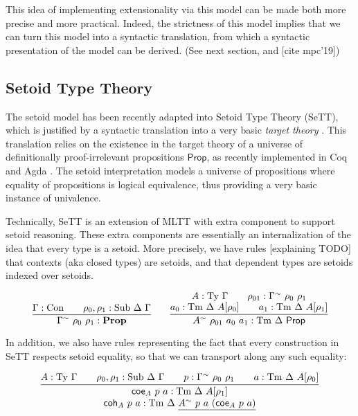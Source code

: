 \documentclass{easychair}
\newcommand{\GG}{\Gamma}
\newcommand{\DD}{\Delta}
\newcommand{\GD}{\Delta}
\newcommand{\coe}{\textsf{coe}}
\newcommand{\coh}{\textsf{coh}}
\newcommand{\tyj}[2]{#2 : \Ty\ #1}
\newcommand{\tmj}[3]{#2 : \Tm\ #1\ #3}
\newcommand{\subj}[3]{#1 : \mathrm{Sub}\ #2\ #3}
\newcommand{\Prop}{\textsf{Prop}}
\newcommand{\Con}{\mathrm{Con}}
\newcommand{\Ty}{\mathrm{Ty}}
\newcommand{\Tm}{\mathrm{Tm}}
\newcommand{\metaprop}{\mathbf{Prop}}
\begin{document}
This idea of implementing extensionality via this model can be made both more
precise and more practical. Indeed, the strictness of this model implies that we
can turn this model into a syntactic translation, from which a syntactic
presentation of the model can be derived. (See next section, and [cite mpc'19])


\subsection{Setoid Type Theory}

The setoid model has been recently adapted into Setoid Type Theory (SeTT), which
is justified by a syntactic translation into a very basic \emph{target theory}
\cite{mpc19}. This translation relies on the existence in the target theory of a
universe of definitionally proof-irrelevant propositions $\Prop$, as recently
implemented in Coq and Agda \cite{gilbert}. The setoid interpretation models a
universe of propositions where equality of propositions is logical equivalence,
thus providing a very basic instance of univalence.

Technically, SeTT is an extension of MLTT with extra component to support setoid
reasoning. These extra components are essentially an internalization of the idea
that every type is a setoid. More precisely, we have rules [explaining TODO]
that contexts (aka closed types) are setoids, and that dependent types are
setoids indexed over setoids.

\[
\infer{
  \GG^\sim\ \rho_0\ \rho_1 : \metaprop
}{
  \GG : \Con \qquad \subj{\rho_0, \rho_1}{\DD}{\GG}
}
\qquad
\infer{
  A^{\sim}\ \rho_{01}\ a_0\ a_1 : \Tm\ \DD\ \Prop
}{
  \deduce{
    a_0 : \Tm\ \DD\ A[\rho_0] \qquad a_1 : \Tm\ \DD\ A[\rho_1]
  }{
    A : \Ty\ \GG \qquad \rho_{01} : \GG^{\sim}\ \rho_0\ \rho_1
  }
}
\]


In addition, we also have rules representing the fact that every construction in
SeTT respects setoid equality, so that we can transport along any such equality:

    \[
    \infer{
      \deduce{
        \tmj{\GD}{\coh_A\ p\ a}{\underline{A^\sim\ p\ a\ (\coe_A\ p\ a)}}
      }{
        \tmj{\GD}{\coe_A\ p\ a}{A[\rho_1]}
      }
    }{
      \tyj{\GG}{A} \qquad \subj{\rho_0, \rho_1}{\GD}{\GG} \qquad
      p : \GG^\sim\ \rho_0\ \rho_1\qquad
      \tmj{\GD}{a}{A[\rho_0]}
    }
    \]
\end{document}
